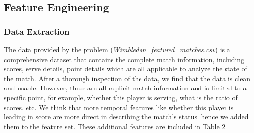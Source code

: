 \documentclass[12pt]{article}  %
\begin{document}
\subsection{Feature Engineering}

\subsubsection{Data Extraction}
The data provided by the problem (\textit{Wimbledon\_featured\_matches.csv}) is a comprehensive dataset that contains the complete match information, including scores, serve details, point details which are all applicable to analyze the state of the match. After a thorough inspection of the data, we find that the data is clean and usable. However, these are all explicit match information and is limited to a specific point, for example, whether this player is serving, what is the ratio of scores, etc. We think that more temporal features like whether this player is leading in score are more direct in describing the match’s status; hence we added them to the feature set. These additional features are included in Table 2.


\begin{table}[htbp]
	\centering  %
	\caption{Added Match Information}
\end{table}
\end{document}

